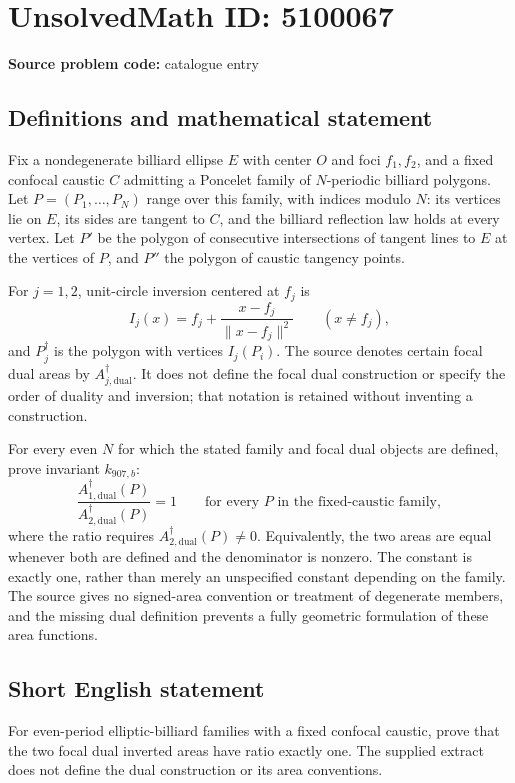 \documentclass[11pt]{article}
\begin{document}
\section*{UnsolvedMath ID: 5100067}
\textbf{Source problem code:} catalogue entry
\subsection{Definitions and mathematical statement}
Fix a nondegenerate billiard ellipse $E$ with center $O$ and foci $f_1,f_2$, and a fixed confocal caustic $C$ admitting a Poncelet family of $N$-periodic billiard polygons. Let $P=(P_1,\ldots,P_N)$ range over this family, with indices modulo $N$: its vertices lie on $E$, its sides are tangent to $C$, and the billiard reflection law holds at every vertex. Let $P'$ be the polygon of consecutive intersections of tangent lines to $E$ at the vertices of $P$, and $P''$ the polygon of caustic tangency points.

For $j=1,2$, unit-circle inversion centered at $f_j$ is
\[
I_j(x)=f_j+\frac{x-f_j}{\|x-f_j\|^2}\qquad(x\ne f_j),
\]
and $P_j^\dagger$ is the polygon with vertices $I_j(P_i)$. The source denotes certain focal dual areas by $A_{j,\mathrm{dual}}^\dagger$. It does not define the focal dual construction or specify the order of duality and inversion; that notation is retained without inventing a construction.

For every even $N$ for which the stated family and focal dual objects are defined, prove invariant $k_{907,b}$:
\[
\frac{A_{1,\mathrm{dual}}^\dagger(P)}{A_{2,\mathrm{dual}}^\dagger(P)}=1
\qquad\text{for every }P\text{ in the fixed-caustic family},
\]
where the ratio requires $A_{2,\mathrm{dual}}^\dagger(P)\ne0$. Equivalently, the two areas are equal whenever both are defined and the denominator is nonzero. The constant is exactly one, rather than merely an unspecified constant depending on the family. The source gives no signed-area convention or treatment of degenerate members, and the missing dual definition prevents a fully geometric formulation of these area functions.
\subsection{Short English statement}
For even-period elliptic-billiard families with a fixed confocal caustic, prove that the two focal dual inverted areas have ratio exactly one. The supplied extract does not define the dual construction or its area conventions.
\end{document}
